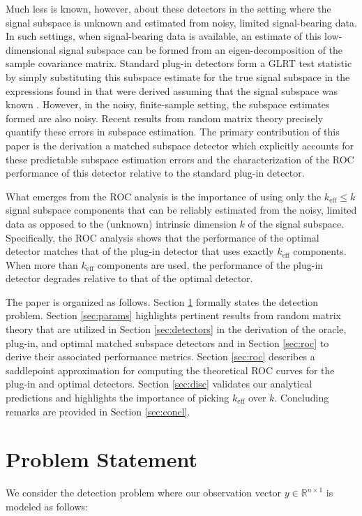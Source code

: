 Much less is known, however, about these detectors in the setting where the signal subspace is unknown and estimated from noisy, limited signal-bearing data. In such settings, when signal-bearing data is available, an estimate of this low-dimensional signal subspace can be formed from an eigen-decomposition of the sample covariance matrix. Standard plug-in detectors form a GLRT test statistic by simply substituting this subspace estimate for the true signal subspace in the expressions found in \cite{mcwhorter2003matched,jin2005cfar} that were derived assuming that the signal subspace was known . However, in the noisy, finite-sample setting, the subspace estimates formed are also noisy. Recent results from random matrix theory precisely quantify these errors in subspace estimation. The primary contribution of this paper is the derivation a matched subspace detector which explicitly accounts for these predictable subspace estimation errors and the characterization of the ROC performance of this detector  relative to the standard plug-in detector.

What emerges from the ROC analysis is the importance of using only the $k_\text{eff} \leq k$ signal subspace components that can be reliably estimated from the noisy, limited data as opposed to the (unknown) intrinsic dimension $k$ of the signal subspace.  Specifically, the ROC analysis shows that the performance of the optimal detector matches that of the plug-in detector that uses exactly $k_\text{eff}$ components. When more than $k_{\text{eff}}$ components are used, the performance of the plug-in detector degrades relative to that of the optimal detector.

The paper is organized as follows. Section \ref{sec:prob} formally states the detection problem. Section \ref{sec:params} highlights pertinent results from random matrix theory that are utilized in Section \ref{sec:detectors} in the derivation of the oracle, plug-in, and optimal matched subspace detectors and in Section \ref{sec:roc} to derive their associated performance metrics. Section \ref{sec:roc} describes a saddlepoint approximation for computing the theoretical ROC curves for the plug-in and optimal detectors. Section \ref{sec:disc} validates our analytical predictions and highlights the importance of picking $k_{\text{eff}}$ over $k$. Concluding remarks are provided in Section \ref{sec:concl}.


\section{Problem Statement}\label{sec:prob}
We consider the detection problem where our observation vector $y \in \mathbb{R}^{n \times 1}$ is modeled as follows:

